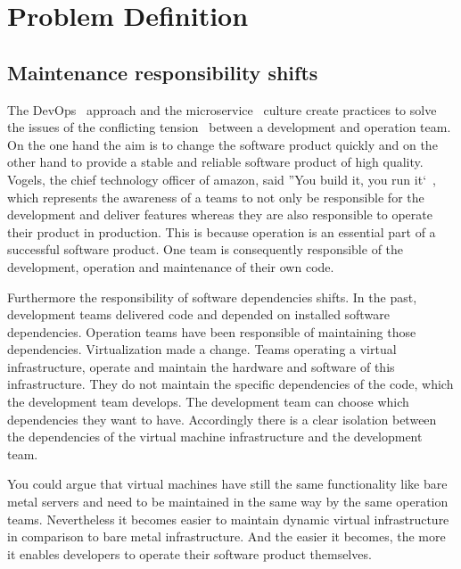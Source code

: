 \chapter{Problem Definition}

\section{Maintenance responsibility shifts}

The DevOps~\cite{devops_definition} approach and the
microservice~\cite{microservices_fowler} culture create practices to solve the issues of
the conflicting tension~\cite{sre_intro} between a development and operation team. On the
one hand the aim is to change the software product quickly and on the other hand to
provide a stable and reliable software product of high quality. Vogels, the chief
technology officer of amazon, said ''You build it, you run it`~\cite{build_run}, which
represents the awareness of a teams to not only be responsible for the development and
deliver features whereas they are also responsible to operate their product in
production. This is because operation is an essential part of a successful software
product. One team is consequently responsible of the development, operation and
maintenance of their own code.

Furthermore the responsibility of software dependencies shifts. In the past, development
teams delivered code and depended on installed software dependencies. Operation teams have
been responsible of maintaining those dependencies. Virtualization made a
change. Teams operating a virtual infrastructure, operate and maintain the
hardware and software of this infrastructure. They do not maintain the specific
dependencies of the code, which the development team develops. The development team can
choose which dependencies they want to have. Accordingly there is a clear isolation
between the dependencies of the virtual machine infrastructure and the development team.

You could argue that virtual machines have still the same functionality like bare metal
servers and need to be maintained in the same way by the same operation
teams. Nevertheless it becomes easier to maintain dynamic virtual
infrastructure~\cite{infra_as_code_platforms} in comparison to bare metal
infrastructure. And the easier it becomes, the more it enables developers to operate their
software product themselves.

